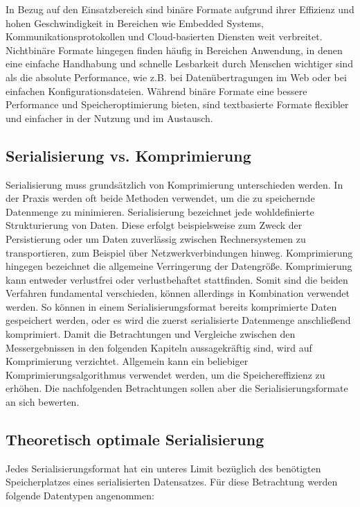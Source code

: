 \documentclass[ngerman]{seminarvorlage}
\begin{document}
In Bezug auf den Einsatzbereich sind binäre Formate aufgrund ihrer Effizienz und hohen Geschwindigkeit in Bereichen wie Embedded Systems, Kommunikationsprotokollen und Cloud-basierten Diensten weit verbreitet. Nichtbinäre Formate hingegen finden häufig in Bereichen Anwendung, in denen eine einfache Handhabung und schnelle Lesbarkeit durch Menschen wichtiger sind als die absolute Performance, wie z.B. bei Datenübertragungen im Web oder bei einfachen Konfigurationsdateien. Während binäre Formate eine bessere Performance und Speicheroptimierung bieten, sind textbasierte Formate flexibler und einfacher in der Nutzung und im Austausch.

\newpage
 
\subsection{Serialisierung vs. Komprimierung}

Serialisierung muss grundsätzlich von Komprimierung unterschieden werden. In der Praxis werden oft beide Methoden verwendet, um die zu speichernde Datenmenge zu minimieren. Serialisierung bezeichnet jede wohldefinierte Strukturierung von Daten. Diese erfolgt beispielsweise zum Zweck der Persistierung oder um Daten zuverlässig zwischen Rechnersystemen zu transportieren, zum Beispiel über Netzwerkverbindungen hinweg. Komprimierung hingegen bezeichnet die allgemeine Verringerung der Datengröße. Komprimierung kann entweder verlustfrei oder verlustbehaftet stattfinden. Somit sind die beiden Verfahren fundamental verschieden, können allerdings in Kombination verwendet werden. So können in einem Serialisierungsformat bereits komprimierte Daten gespeichert werden, oder es wird die zuerst serialisierte Datenmenge anschließend komprimiert. Damit die Betrachtungen und Vergleiche zwischen den Messergebnissen in den folgenden Kapiteln aussagekräftig sind, wird auf Komprimierung verzichtet. Allgemein kann ein beliebiger Komprimierungsalgorithmus verwendet werden, um die Speichereffizienz zu erhöhen. Die nachfolgenden Betrachtungen sollen aber die Serialisierungsformate an sich bewerten.

\subsection{Theoretisch optimale Serialisierung}

Jedes Serialisierungsformat hat ein unteres Limit bezüglich des benötigten Speicherplatzes eines serialisierten Datensatzes. Für diese Betrachtung werden folgende Datentypen angenommen: 
\end{document}
